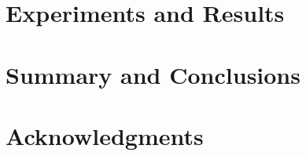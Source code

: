 \documentclass[fleqn,10pt]{SelfArx} %
\begin{document}
\section{Experiments and Results}


\bigskip
\bigskip
\section{Summary and Conclusions}
\bigskip
\bigskip
\bigskip



\section*{Acknowledgments} %







\end{document}
